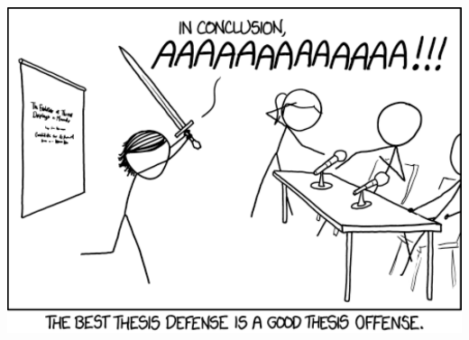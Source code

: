 \documentclass[12pt]{beamer}
\begin{document}
\begin{frame}

	\null
	\vfill
	\includegraphics[width=\textwidth,height=\textheight,keepaspectratio=true]{images/thesis_defense}
	\vfill

\end{frame}
\end{document}
